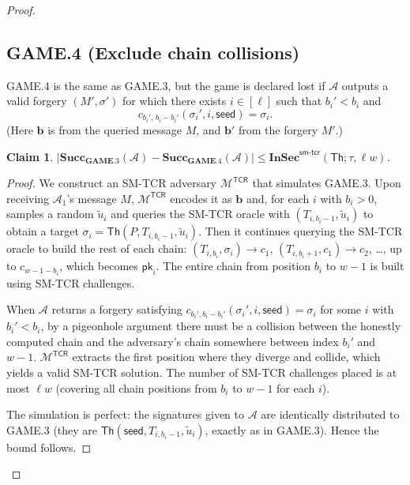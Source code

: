 \documentclass[11pt,a4paper]{article}
\newtheorem{claim}[theorem]{Claim}
\newcommand{\Th}{\mathsf{Th}}
\newcommand{\pk}{\mathsf{pk}}
\newcommand{\seed}{\mathsf{seed}}
\newcommand{\InSec}[1]{\mathbf{InSec}^{\mathsf{#1}}}
\newcommand{\Succ}{\mathbf{Succ}}
\newcommand{\GAME}{\mathbf{GAME}}
\begin{document}
\begin{proof}
\subsection*{GAME.4 (Exclude chain collisions)}
GAME.4 is the same as GAME.3, but the game is declared lost if $\mathcal{A}$ outputs a valid forgery $(M',\sigma')$ for which there exists $i \in [\ell]$ such that $b_i' < b_i$ and
\[
c_{b_i',\,b_i-b_i'}(\sigma_i', i, \seed) = \sigma_i.
\]
(Here $\mathbf{b}$ is from the queried message $M$, and $\mathbf{b}'$ from the forgery $M'$.)

\begin{claim}
$|\Succ_{\GAME.3}(\mathcal{A}) - \Succ_{\GAME.4}(\mathcal{A})| \le \InSec{sm\text{-}tcr}(\Th; \tau, \ell w)$.
\end{claim}

\begin{proof}
We construct an SM-TCR adversary $\mathcal{M}^{\mathsf{TCR}}$ that simulates GAME.3. Upon receiving $\mathcal{A}_1$'s message $M$, $\mathcal{M}^{\mathsf{TCR}}$ encodes it as $\mathbf{b}$ and, for each $i$ with $b_i > 0$, samples a random $\tilde{u}_i$ and queries the SM-TCR oracle with $(T_{i,b_i-1}, \tilde{u}_i)$ to obtain a target $\sigma_i = \Th(P, T_{i,b_i-1}, \tilde{u}_i)$. Then it continues querying the SM-TCR oracle to build the rest of each chain: $(T_{i,b_i}, \sigma_i) \to c_1$, $(T_{i,b_i+1}, c_1) \to c_2$, \ldots, up to $c_{w-1-b_i}$, which becomes $\pk_i$. The entire chain from position $b_i$ to $w-1$ is built using SM-TCR challenges.

When $\mathcal{A}$ returns a forgery satisfying $c_{b_i',b_i-b_i'}(\sigma_i',i,\seed)=\sigma_i$ for some $i$ with $b_i' < b_i$, by a pigeonhole argument there must be a collision between the honestly computed chain and the adversary's chain somewhere between index $b_i'$ and $w-1$. $\mathcal{M}^{\mathsf{TCR}}$ extracts the first position where they diverge and collide, which yields a valid SM-TCR solution. The number of SM-TCR challenges placed is at most $\ell w$ (covering all chain positions from $b_i$ to $w-1$ for each $i$).

The simulation is perfect: the signatures given to $\mathcal{A}$ are identically distributed to GAME.3 (they are $\Th(\seed, T_{i,b_i-1}, \tilde{u}_i)$, exactly as in GAME.3). Hence the bound follows.
\end{proof}


\end{proof}
\end{document}
